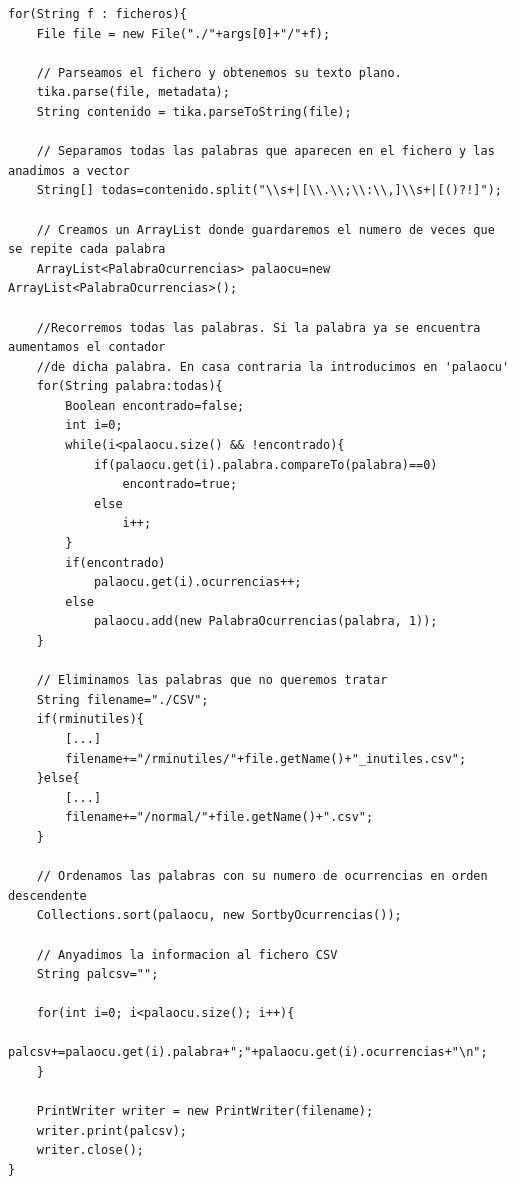 \lstset{language=C, breaklines=true, basicstyle=\footnotesize}
\begin{lstlisting}[frame=single]
for(String f : ficheros){
	File file = new File("./"+args[0]+"/"+f);
   					
	// Parseamos el fichero y obtenemos su texto plano.
   	tika.parse(file, metadata);
   	String contenido = tika.parseToString(file);
   					
   	// Separamos todas las palabras que aparecen en el fichero y las anadimos a vector
   	String[] todas=contenido.split("\\s+|[\\.\\;\\:\\,]\\s+|[()?!]");
   					
   	// Creamos un ArrayList donde guardaremos el numero de veces que se repite cada palabra
   	ArrayList<PalabraOcurrencias> palaocu=new ArrayList<PalabraOcurrencias>();
   	
	//Recorremos todas las palabras. Si la palabra ya se encuentra aumentamos el contador
	//de dicha palabra. En casa contraria la introducimos en 'palaocu'
   	for(String palabra:todas){
   		Boolean encontrado=false;
   		int i=0;				
   		while(i<palaocu.size() && !encontrado){
   			if(palaocu.get(i).palabra.compareTo(palabra)==0)
   				encontrado=true;
   			else
   				i++;
   		}					
   		if(encontrado)
   			palaocu.get(i).ocurrencias++;
   		else
   			palaocu.add(new PalabraOcurrencias(palabra, 1));
   	}			

	// Eliminamos las palabras que no queremos tratar
	String filename="./CSV";
	if(rminutiles){
		[...]
		filename+="/rminutiles/"+file.getName()+"_inutiles.csv";
	}else{
		[...]
		filename+="/normal/"+file.getName()+".csv";
	}
					
	// Ordenamos las palabras con su numero de ocurrencias en orden descendente
	Collections.sort(palaocu, new SortbyOcurrencias());
	
	// Anyadimos la informacion al fichero CSV
	String palcsv="";
	
	for(int i=0; i<palaocu.size(); i++){
		palcsv+=palaocu.get(i).palabra+";"+palaocu.get(i).ocurrencias+"\n";
	}
	
	PrintWriter writer = new PrintWriter(filename);
	writer.print(palcsv);
	writer.close();
}
\end{lstlisting}
\vspace{0.3cm}

